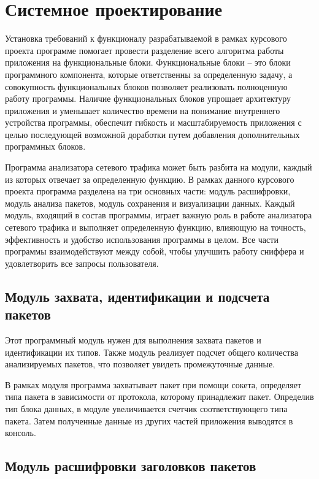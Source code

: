 \section{Системное проектирование}
\label{sec:sysproj}

Установка требований к функционалу разрабатываемой в рамках
курсового проекта программе помогает провести разделение всего алгоритма
работы приложения на функциональные блоки. Функциональные блоки -- это
блоки программного компонента, которые ответственны за определенную
задачу, а совокупность функциональных блоков позволяет реализовать
полноценную работу программы. Наличие функциональных блоков упрощает 
архитектуру приложения и уменьшает количество времени на понимание 
внутреннего устройства программы, обеспечит гибкость и масштабируемость 
приложения с целью последующей возможной доработки путем добавления 
дополнительных программных блоков.


Программа анализатора сетевого трафика может быть разбита на модули,
каждый из которых отвечает за определенную функцию. В рамках данного
курсового проекта программа разделена на три основных части: модуль
расшифровки, модуль анализа пакетов, модуль сохранения и визуализации
данных. Каждый модуль, входящий в состав программы, играет важную роль в
работе анализатора сетевого трафика и выполняет определенную функцию,
влияющую на точность, эффективность и удобство использования
программы в целом. Все части программы взаимодействуют между собой, чтобы
улучшить работу сниффера и удовлетворить все запросы пользователя.


\subsection{Модуль захвата, идентификации и подсчета пакетов}

Этот программный модуль нужен для выполнения захвата пакетов и 
идентификации их типов. Также модуль реализует подсчет общего 
количества анализируемых пакетов, что позволяет увидеть промежуточные данные.


В рамках модуля программа захватывает пакет при помощи сокета,
определяет типа пакета в зависимости от протокола, которому принадлежит
пакет. Определив тип блока данных, в модуле увеличивается счетчик 
соответствующего типа пакета. Затем полученные данные из других частей 
приложения выводятся в консоль.


\subsection{Модуль расшифровки заголовков пакетов}


